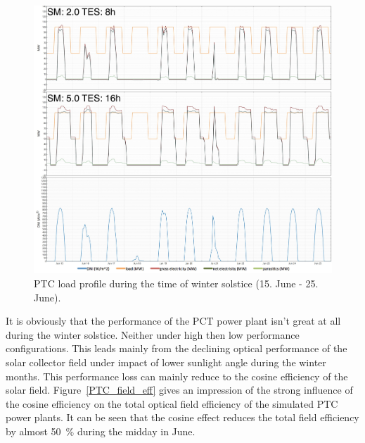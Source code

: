 \begin{figure}[htbp]  
\centering
\includegraphics[width=1\linewidth]{FIG/PTC_winter_load}
\caption[PTC load profile during the time of winter solstice (15. June - 25. June).]{PTC load profile during the time of winter solstice (15. June - 25. June).}\label{PTC_winter_load}
\end{figure}
It is obviously that the performance of the PCT power plant isn't great at all during the winter solstice. Neither under high then low performance configurations. This leads mainly from the declining optical performance of the solar collector field under impact of lower sunlight angle during the winter months. This performance loss can mainly reduce to the cosine efficiency of the solar field. Figure~\ref{PTC_field_eff} gives an impression of the strong influence of the cosine efficiency on the total optical field efficiency of the simulated PTC power plants. It can be seen that the cosine effect reduces the total field efficiency by almost 50~\% during the midday in June. 

